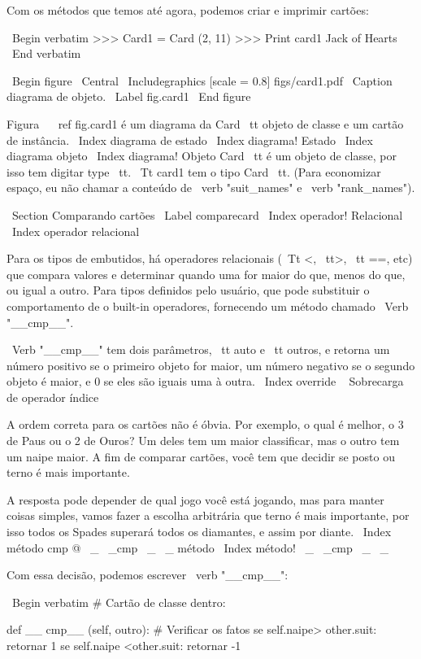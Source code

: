 \documentclass[10pt]{book}
\begin{document}
{{{{{{{{{{{{{{{{Com os métodos que temos até agora, podemos criar e imprimir cartões:

\ Begin {verbatim}
>>> Card1 = Card (2, 11)
>>> Print card1
Jack of Hearts
\ End {verbatim}

\ Begin {figure}
\ Central
{\ Includegraphics [scale = 0.8] {figs/card1.pdf}}
\ Caption {diagrama de objeto.}
\ Label {} fig.card1
\ End {figure}

Figura ~ \ ref {} fig.card1 é um diagrama da {Card \ tt} objeto de classe
e um cartão de instância.
\ Index {diagrama de estado}
\ Index {diagrama! Estado}
\ Index {diagrama objeto}
\ Index {diagrama! Objeto}
{Card \ tt} é um objeto de classe, por isso tem digitar {type \ tt}. {\ Tt
card1} tem o tipo {Card \ tt}. (Para economizar espaço, eu não chamar a
conteúdo de \ verb "suit_names" e \ verb "rank_names").


\ Section {Comparando cartões}
\ Label {} comparecard
\ Index {operador! Relacional}
\ Index {operador relacional}

Para os tipos de embutidos, há operadores relacionais
({\ Tt <}, {\ tt>}, {\ tt ==}, etc)
que compara
valores e determinar quando uma for maior do que, menos do que, ou igual a
outro. Para tipos definidos pelo usuário, que pode substituir o comportamento de
o built-in operadores, fornecendo um método chamado
\ Verb "__cmp__".  

\ Verb "__cmp__" tem dois parâmetros, {\ tt auto} e {\ tt outros},
e retorna um número positivo se o primeiro objeto for maior, um
número negativo se o segundo objeto é maior, e 0 se eles são
iguais uma à outra.
\ Index {override}
\ {} Sobrecarga de operador índice

A ordem correta para os cartões não é óbvia.
Por exemplo, o qual
é melhor, o 3 de Paus ou o 2 de Ouros? Um deles tem um maior
classificar, mas o outro tem um naipe maior. A fim de comparar
cartões, você tem que decidir se posto ou terno é mais importante.

A resposta pode depender de qual jogo você está jogando, mas para manter
coisas simples, vamos fazer a escolha arbitrária que terno é mais
importante, por isso todos os Spades superará todos os diamantes,
e assim por diante.
\ Index {método cmp @ \ _ \ _cmp \ _ \ _ método}
\ Index {método! \ _ \ _cmp \ _ \ _}

Com essa decisão, podemos escrever \ verb "__cmp__":

\ Begin {verbatim}
# Cartão de classe dentro:

    def __ cmp__ (self, outro):
        # Verificar os fatos
        se self.naipe> other.suit: retornar 1
        se self.naipe <other.suit: retornar -1

}}}}}}}}}}}}}}}}
\end{document}
